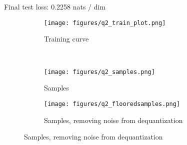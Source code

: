 \documentclass{article}
\begin{document}
\\\\

Final test loss: 0.2258  nats / dim
\begin{figure}[H]
    \centering
    \begin{subfigure}{0.45\textwidth}
        \centering
        \texttt{[image: figures/q2\_train\_plot.png]}
        \caption{Training curve}
    \end{subfigure}
    \\
    \begin{subfigure}{0.48\textwidth}
        \centering
        \texttt{[image: figures/q2\_samples.png]}
        \caption{Samples}
    \end{subfigure}
    \begin{subfigure}{0.48\textwidth}
        \centering
        \texttt{[image: figures/q2\_flooredsamples.png]}
        \caption{Samples, removing noise from dequantization}
    \end{subfigure}
\end{figure}

\newpage
{}
\end{document}
